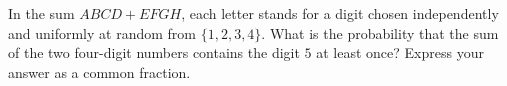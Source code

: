 In the sum $ABCD+EFGH$, each letter stands for a digit chosen independently and uniformly at random from $\{1,2,3,4\}$. What is the probability that the sum of the two four-digit numbers contains the digit $5$ at least once? Express your answer as a common fraction.
